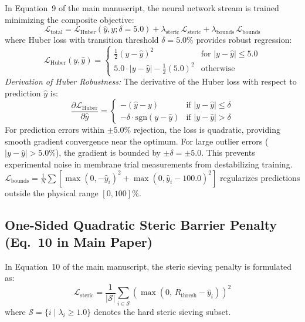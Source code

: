 \documentclass[11pt]{article}
\begin{document}
In Equation~9 of the main manuscript, the neural network stream is trained minimizing the composite objective:
\begin{equation}
\mathcal{L}_{\mathrm{total}} = \mathcal{L}_{\mathrm{Huber}}(\hat{y}, y; \delta = 5.0) + \lambda_{\mathrm{steric}}\,\mathcal{L}_{\mathrm{steric}} + \lambda_{\mathrm{bounds}}\,\mathcal{L}_{\mathrm{bounds}}
\label{eq:s_loss}
\end{equation}
where Huber loss with transition threshold $\delta = 5.0\%$ provides robust regression:
\begin{equation}
\mathcal{L}_{\mathrm{Huber}}(y, \hat{y}) = \begin{cases} 
\frac{1}{2}(y - \hat{y})^2 & \text{for } |y - \hat{y}| \le 5.0 \\
5.0 \cdot |y - \hat{y}| - \frac{1}{2}(5.0)^2 & \text{otherwise}
\end{cases}
\label{eq:s_huber}
\end{equation}
\noindent\textit{Derivation of Huber Robustness:} The derivative of the Huber loss with respect to prediction $\hat{y}$ is:
\begin{equation}
\frac{\partial \mathcal{L}_{\mathrm{Huber}}}{\partial \hat{y}} = \begin{cases}
-(\hat{y} - y) & \text{if } |y - \hat{y}| \le \delta \\
-\delta \cdot \mathrm{sgn}(y - \hat{y}) & \text{if } |y - \hat{y}| > \delta
\end{cases}
\label{eq:s_huber_grad}
\end{equation}
For prediction errors within $\pm 5.0\%$ rejection, the loss is quadratic, providing smooth gradient convergence near the optimum. For large outlier errors ($|y - \hat{y}| > 5.0\%$), the gradient is bounded by $\pm\delta = \pm 5.0$. This prevents experimental noise in membrane trial measurements from destabilizing training. $\mathcal{L}_{\mathrm{bounds}} = \frac{1}{N}\sum [\max(0, -\hat{y}_i)^2 + \max(0, \hat{y}_i - 100.0)^2]$ regularizes predictions outside the physical range $[0, 100]\%$.

\subsection{One-Sided Quadratic Steric Barrier Penalty (Eq.~10 in Main Paper)}
\label{sec:steric_loss_derivation}

In Equation~10 of the main manuscript, the steric sieving penalty is formulated as:
\begin{equation}
\mathcal{L}_{\mathrm{steric}} = \frac{1}{|\mathcal{S}|} \sum_{i \in \mathcal{S}} \left( \max\left(0,\, R_{\mathrm{thresh}} - \hat{y}_i\right) \right)^2
\label{eq:s_steric_loss}
\end{equation}
where $\mathcal{S} = \{i \mid \lambda_i \ge 1.0\}$ denotes the hard steric sieving subset.
\end{document}
